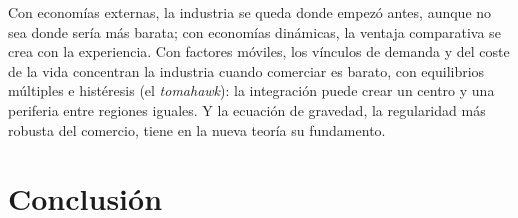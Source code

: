 \documentclass[11pt]{article}
\begin{document}
\begin{ideaclave}
Con economías externas, la industria se queda donde empezó antes, aunque no sea donde sería más barata; con economías dinámicas, la ventaja comparativa se crea con la experiencia. Con factores móviles, los vínculos de demanda y del coste de la vida concentran la industria cuando comerciar es barato, con equilibrios múltiples e histéresis (el \emph{tomahawk}): la integración puede crear un centro y una periferia entre regiones iguales. Y la ecuación de gravedad, la regularidad más robusta del comercio, tiene en la nueva teoría su fundamento.
\end{ideaclave}

\section*{Conclusión}
\end{document}

